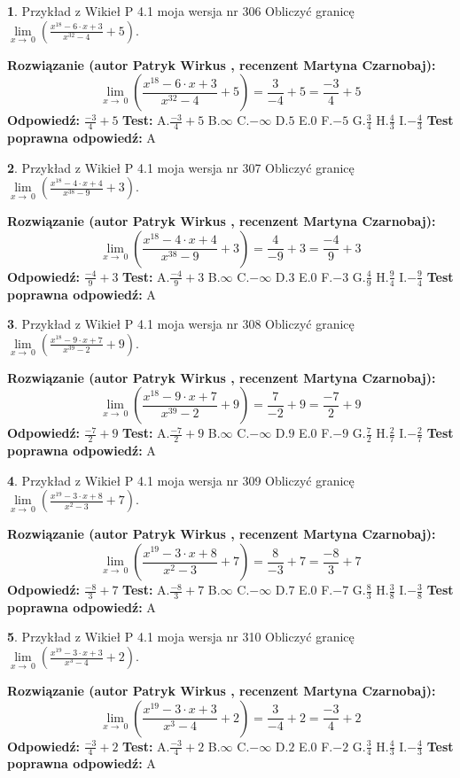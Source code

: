 \documentclass[12pt, a4paper]{article}
\theoremstyle{definition} %
\newtheorem{zad}{}
\newcommand{\zadStart}[1]{\begin{zad}#1\newline}
\newcommand{\zadStop}{\end{zad}}
\newcommand{\rozwStart}[2]{\noindent \textbf{Rozwiązanie (autor #1 , recenzent #2): }\newline}
\newcommand{\rozwStop}{\newline}
\newcommand{\odpStart}{\noindent \textbf{Odpowiedź:}\newline}
\newcommand{\odpStop}{\newline}
\newcommand{\testStart}{\noindent \textbf{Test:}\newline}
\newcommand{\testStop}{\newline}
\newcommand{\kluczStart}{\noindent \textbf{Test poprawna odpowiedź:}\newline}
\newcommand{\kluczStop}{\newline}
\begin{document}
\zadStart{Przykład z Wikieł P 4.1 moja wersja nr 306}
Obliczyć granicę $\lim\limits_{x\to\ 0}(\frac{x^{18}-6 \cdot x +3}{x^{32}-4}+5)$.
\zadStop
\rozwStart{Patryk Wirkus}{Martyna Czarnobaj}
$$\lim\limits_{x\to\ 0}(\frac{x^{18}-6 \cdot x +3}{x^{32}-4}+5)=\frac{3}{-4}+5=\frac{-3}{4}+5$$
\rozwStop
\odpStart
$\frac{-3}{4}+5$
\odpStop
\testStart
A.$\frac{-3}{4}+5$
B.$\infty$
C.$-\infty$
D.$5$
E.$0$
F.$-5$
G.$\frac{3}{4}$
H.$\frac{4}{3}$
I.$-\frac{4}{3}$
\testStop
\kluczStart
A
\kluczStop



\zadStart{Przykład z Wikieł P 4.1 moja wersja nr 307}
Obliczyć granicę $\lim\limits_{x\to\ 0}(\frac{x^{18}-4 \cdot x +4}{x^{38}-9}+3)$.
\zadStop
\rozwStart{Patryk Wirkus}{Martyna Czarnobaj}
$$\lim\limits_{x\to\ 0}(\frac{x^{18}-4 \cdot x +4}{x^{38}-9}+3)=\frac{4}{-9}+3=\frac{-4}{9}+3$$
\rozwStop
\odpStart
$\frac{-4}{9}+3$
\odpStop
\testStart
A.$\frac{-4}{9}+3$
B.$\infty$
C.$-\infty$
D.$3$
E.$0$
F.$-3$
G.$\frac{4}{9}$
H.$\frac{9}{4}$
I.$-\frac{9}{4}$
\testStop
\kluczStart
A
\kluczStop



\zadStart{Przykład z Wikieł P 4.1 moja wersja nr 308}
Obliczyć granicę $\lim\limits_{x\to\ 0}(\frac{x^{18}-9 \cdot x +7}{x^{39}-2}+9)$.
\zadStop
\rozwStart{Patryk Wirkus}{Martyna Czarnobaj}
$$\lim\limits_{x\to\ 0}(\frac{x^{18}-9 \cdot x +7}{x^{39}-2}+9)=\frac{7}{-2}+9=\frac{-7}{2}+9$$
\rozwStop
\odpStart
$\frac{-7}{2}+9$
\odpStop
\testStart
A.$\frac{-7}{2}+9$
B.$\infty$
C.$-\infty$
D.$9$
E.$0$
F.$-9$
G.$\frac{7}{2}$
H.$\frac{2}{7}$
I.$-\frac{2}{7}$
\testStop
\kluczStart
A
\kluczStop



\zadStart{Przykład z Wikieł P 4.1 moja wersja nr 309}
Obliczyć granicę $\lim\limits_{x\to\ 0}(\frac{x^{19}-3 \cdot x +8}{x^{2}-3}+7)$.
\zadStop
\rozwStart{Patryk Wirkus}{Martyna Czarnobaj}
$$\lim\limits_{x\to\ 0}(\frac{x^{19}-3 \cdot x +8}{x^{2}-3}+7)=\frac{8}{-3}+7=\frac{-8}{3}+7$$
\rozwStop
\odpStart
$\frac{-8}{3}+7$
\odpStop
\testStart
A.$\frac{-8}{3}+7$
B.$\infty$
C.$-\infty$
D.$7$
E.$0$
F.$-7$
G.$\frac{8}{3}$
H.$\frac{3}{8}$
I.$-\frac{3}{8}$
\testStop
\kluczStart
A
\kluczStop



\zadStart{Przykład z Wikieł P 4.1 moja wersja nr 310}
Obliczyć granicę $\lim\limits_{x\to\ 0}(\frac{x^{19}-3 \cdot x +3}{x^{3}-4}+2)$.
\zadStop
\rozwStart{Patryk Wirkus}{Martyna Czarnobaj}
$$\lim\limits_{x\to\ 0}(\frac{x^{19}-3 \cdot x +3}{x^{3}-4}+2)=\frac{3}{-4}+2=\frac{-3}{4}+2$$
\rozwStop
\odpStart
$\frac{-3}{4}+2$
\odpStop
\testStart
A.$\frac{-3}{4}+2$
B.$\infty$
C.$-\infty$
D.$2$
E.$0$
F.$-2$
G.$\frac{3}{4}$
H.$\frac{4}{3}$
I.$-\frac{4}{3}$
\testStop
\kluczStart
A
\kluczStop
\end{document}
